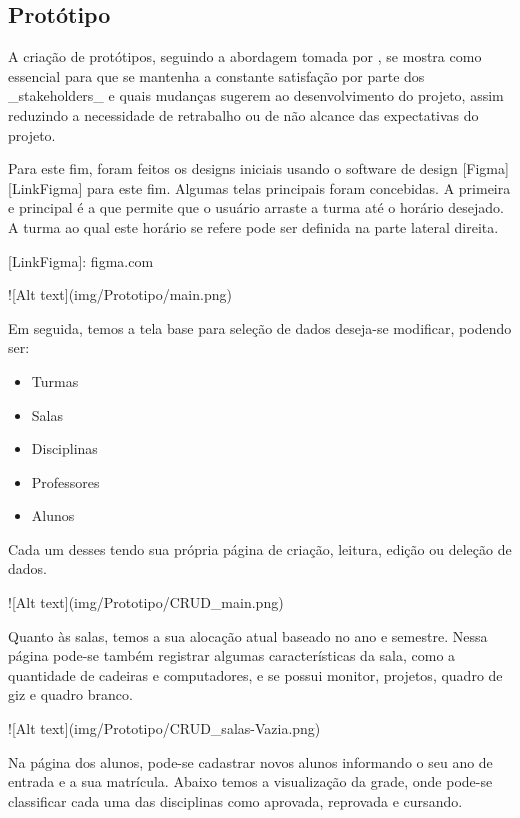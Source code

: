 \subsection{Protótipo} %

    A criação de protótipos, seguindo a abordagem tomada por \cite{andre_interaction_2018}, se mostra como essencial para que se mantenha a constante satisfação por parte dos _stakeholders_ e quais mudanças sugerem ao desenvolvimento do projeto, assim reduzindo a necessidade de retrabalho ou de não alcance das expectativas do projeto.

    Para este fim, foram feitos os designs iniciais usando o software de design [Figma][LinkFigma] para este fim. Algumas telas principais foram concebidas. A primeira e principal é a que permite que o usuário arraste a turma até o horário desejado. A turma ao qual este horário se refere pode ser definida na parte lateral direita.

    [LinkFigma]: figma.com

    ![Alt text](img/Prototipo/main.png)

    Em seguida, temos a tela base para seleção de dados deseja-se modificar, podendo ser:

    \begin{itemize}
        \item Turmas
        \item Salas
        \item Disciplinas
        \item Professores
        \item Alunos
    \end{itemize}


    Cada um desses tendo sua própria página de criação, leitura, edição ou deleção de dados.

    ![Alt text](img/Prototipo/CRUD_main.png)

    Quanto às salas, temos a sua alocação atual baseado no ano e semestre. Nessa página pode-se também registrar algumas características da sala, como a quantidade de cadeiras e computadores, e se possui monitor, projetos, quadro de giz e quadro branco.

    ![Alt text](img/Prototipo/CRUD_salas-Vazia.png)

    Na página dos alunos, pode-se cadastrar novos alunos informando o seu ano de entrada e a sua matrícula. Abaixo temos a visualização da grade, onde pode-se classificar cada uma das disciplinas como aprovada, reprovada e cursando.


